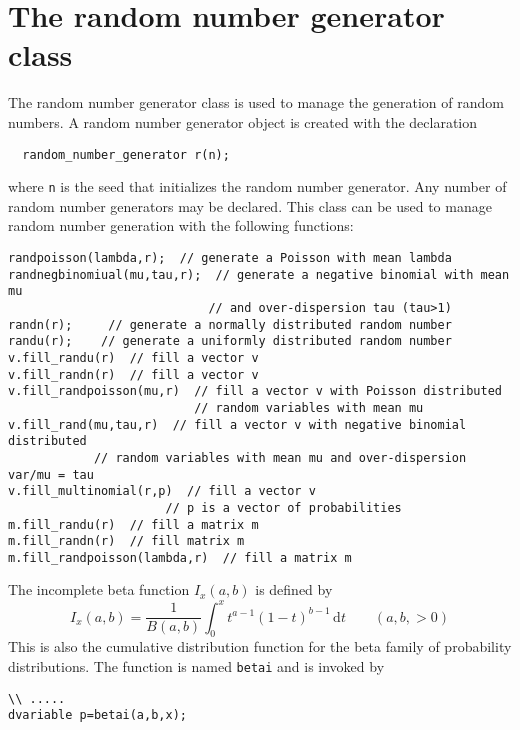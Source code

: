 \section{The random number generator class}\label{rng}

The random number generator class is used to manage the generation of
random numbers. A random number generator object is created with the
declaration
\begin{lstlisting}
  random_number_generator r(n);
\end{lstlisting}
where \texttt{n} is the seed that initializes the random number generator.
Any number of random number generators may be declared.
This class can be used to manage random number generation with the following functions:
\begin{lstlisting}
randpoisson(lambda,r);  // generate a Poisson with mean lambda
randnegbinomiual(mu,tau,r);  // generate a negative binomial with mean mu
                            // and over-dispersion tau (tau>1)
randn(r);     // generate a normally distributed random number
randu(r);    // generate a uniformly distributed random number
v.fill_randu(r)  // fill a vector v
v.fill_randn(r)  // fill a vector v
v.fill_randpoisson(mu,r)  // fill a vector v with Poisson distributed
                          // random variables with mean mu
v.fill_rand(mu,tau,r)  // fill a vector v with negative binomial distributed
            // random variables with mean mu and over-dispersion var/mu = tau
v.fill_multinomial(r,p)  // fill a vector v 
                      // p is a vector of probabilities
m.fill_randu(r)  // fill a matrix m
m.fill_randn(r)  // fill matrix m
m.fill_randpoisson(lambda,r)  // fill a matrix m
\end{lstlisting}
The incomplete beta function $I_x(a,b)$ is defined by
\begin{equation}
  I_x(a,b)=\frac{1}{B(a,b)}\int_0^x t^{a-1}(1-t)^{b-1}\,\textrm{d}t\qquad (a,b,>0)
\end{equation}
This is also the cumulative distribution function for the beta family
of probability distributions.
The function is named \texttt{betai} and is invoked by
\begin{lstlisting}
\\ .....
dvariable p=betai(a,b,x);
\end{lstlisting}


